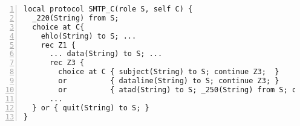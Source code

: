 \begin{lstlisting}[numbers=left]
local protocol SMTP_C(role S, self C) {
  _220(String) from S;
  choice at C{
    ehlo(String) to S; ...
    rec Z1 {
      ... data(String) to S; ...
      rec Z3 {
        choice at C { subject(String) to S; continue Z3;  }
        or          { dataline(String) to S; continue Z3; }
        or          { atad(String) to S; _250(String) from S; continue Z1; }}}
      ...
  } or { quit(String) to S; }
}
\end{lstlisting}
%
